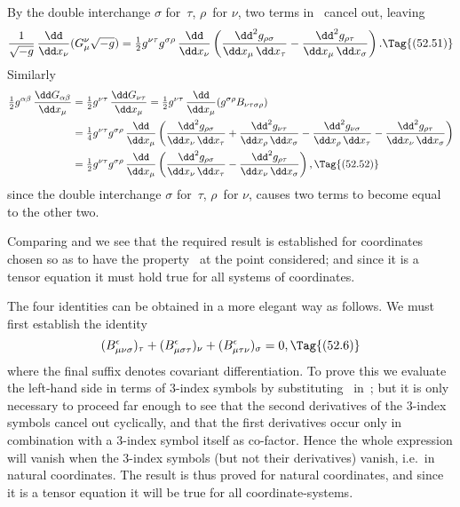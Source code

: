 \documentclass[12pt]{book}
\begin{document}
By the double interchange $\sigma$ for~$\tau$, $\rho$~for $\nu$, two terms in~ cancel out,
leaving
\[
\frac{1}{\sqrt{-g}}\, \frac{\dd}{\dd x_{\nu}} (G_{\mu}^{\nu} \sqrt{-g})
= \tfrac{1}{2} g^{\nu\tau} g^{\sigma\rho}\, \frac{\dd}{\dd x_{\nu}} \left(
    \frac{\dd^{2} g_{\rho\sigma}}{\dd x_{\mu}\, \dd x_{\tau}}
  - \frac{\dd^{2} g_{\rho\tau}}{\dd x_{\mu}\, \dd x_{\sigma}}\right).
\Tag{(52.51)}
\]
Similarly
\begin{align*}
  \tfrac{1}{2} g^{\alpha\beta}\, \frac{\dd G_{\alpha\beta}}{\dd x_{\mu}}
  &= \tfrac{1}{2} g^{\nu\tau}\, \frac{\dd G_{\nu\tau}}{\dd x_{\mu}}
  = \tfrac{1}{2} g^{\nu\tau}\, \frac{\dd}{\dd x_{\mu}} (g^{\sigma\rho} B_{\nu\tau\sigma\rho}) \\
  &= \tfrac{1}{4} g^{\nu\tau} g^{\sigma\rho}\, \frac{\dd}{\dd x_{\mu}}
  \left(\frac{\dd^{2} g_{\rho\sigma}}{\dd x_{\nu}\, \dd x_{\tau}}
  + \frac{\dd^{2} g_{\nu\tau}}{\dd x_{\rho}\, \dd x_{\sigma}}
  - \frac{\dd^{2} g_{\nu\sigma}}{\dd x_{\rho}\, \dd x_{\tau}}
  - \frac{\dd^{2} g_{\rho\tau}}{\dd x_{\nu}\, \dd x_{\sigma}}\right) \\
  &= \tfrac{1}{2} g^{\nu\tau} g^{\sigma\rho}\, \frac{\dd}{\dd x_{\mu}} \left(
    \frac{\dd^{2} g_{\rho\sigma}}{\dd x_{\nu}\, \dd x_{\tau}}
  - \frac{\dd^{2} g_{\rho\tau}}{\dd x_{\nu}\, \dd x_{\sigma}}\right),
  \Tag{(52.52)}
\end{align*}
since the double interchange $\sigma$ for~$\tau$, $\rho$~for $\nu$, causes two terms to become
equal to the other two.

Comparing  and  we see that the required result is established
for coordinates chosen so as to have the property~ at the point
considered; and since it is a tensor equation it must hold true for all systems
of coordinates.

The four identities can be obtained in a more elegant way as follows.
We must first establish the identity
\[
(B^{\epsilon}_{\mu\nu\sigma})_\tau + (B^{\epsilon}_{\mu\sigma\tau})_\nu + (B^{\epsilon}_{\mu\tau\nu})_\sigma = 0,
\Tag{(52.6)}
\]
where the final suffix denotes covariant differentiation.
To prove this we evaluate the left-hand side in terms of $3$-index symbols by substituting~
in~;
but it is only necessary to proceed far enough to see that the second derivatives of the $3$-index symbols
cancel out cyclically, and that the first derivatives occur only in combination with a $3$-index symbol itself as
co\hyp{}factor.
Hence the whole expression will vanish when the $3$-index symbols (but not their derivatives) vanish,
i.e.\ in natural coordinates.
The result is thus proved for natural coordinates, and since it is a tensor equation it will be true for all
coordinate\hyp{}systems.
\end{document}
